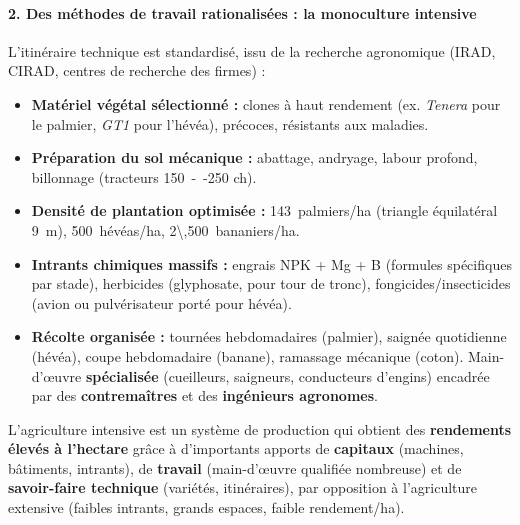 \documentclass[11pt]{article}
\begin{document}
\paragraph{2. Des méthodes de travail rationalisées : la monoculture intensive}
L'itinéraire technique est standardisé, issu de la recherche agronomique (IRAD, CIRAD, centres de recherche des firmes) :
\begin{itemize}
    \item \textbf{Matériel végétal sélectionné :} clones à haut rendement (ex. \emph{Tenera} pour le palmier, \emph{GT1} pour l'hévéa), précoces, résistants aux maladies.
    \item \textbf{Préparation du sol mécanique :} abattage, andryage, labour profond, billonnage (tracteurs \SI{150}{--}{250 ch}).
    \item \textbf{Densité de plantation optimisée :} \SI{143}{palmiers/ha} (triangle équilatéral \SI{9}{m}), \SI{500}{hévéas/ha}, \SI{2\,500}{bananiers/ha}.
    \item \textbf{Intrants chimiques massifs :} engrais NPK + Mg + B (formules spécifiques par stade), herbicides (glyphosate, pour tour de tronc), fongicides/insecticides (avion ou pulvérisateur porté pour hévéa).
    \item \textbf{Récolte organisée :} tournées hebdomadaires (palmier), saignée quotidienne (hévéa), coupe hebdomadaire (banane), ramassage mécanique (coton). Main-d'œuvre \textbf{spécialisée} (cueilleurs, saigneurs, conducteurs d'engins) encadrée par des \textbf{contremaîtres} et des \textbf{ingénieurs agronomes}.
\end{itemize}

\begin{definition}
L'agriculture intensive est un système de production qui obtient des \textbf{rendements élevés à l'hectare} grâce à d'importants apports de \textbf{capitaux} (machines, bâtiments, intrants), de \textbf{travail} (main-d'œuvre qualifiée nombreuse) et de \textbf{savoir-faire technique} (variétés, itinéraires), par opposition à l'agriculture extensive (faibles intrants, grands espaces, faible rendement/ha).
\end{definition}
\end{document}
